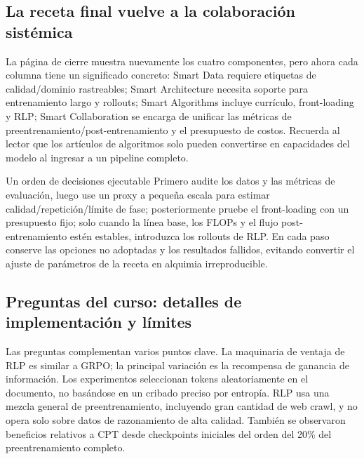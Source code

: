 \subsection{La receta final vuelve a la colaboración sistémica}

La página de cierre muestra nuevamente los cuatro componentes, pero ahora cada columna tiene un significado concreto: Smart Data requiere etiquetas de calidad/dominio rastreables; Smart Architecture necesita soporte para entrenamiento largo y rollouts; Smart Algorithms incluye currículo, front-loading y RLP; Smart Collaboration se encarga de unificar las métricas de preentrenamiento/post-entrenamiento y el presupuesto de costos. Recuerda al lector que los artículos de algoritmos solo pueden convertirse en capacidades del modelo al ingresar a un pipeline completo.


\begin{knowledgebox}{Un orden de decisiones ejecutable}
Primero audite los datos y las métricas de evaluación, luego use un proxy a pequeña escala para estimar calidad/repetición/límite de fase; posteriormente pruebe el front-loading con un presupuesto fijo; solo cuando la línea base, los FLOPs y el flujo post-entrenamiento estén estables, introduzca los rollouts de RLP. En cada paso conserve las opciones no adoptadas y los resultados fallidos, evitando convertir el ajuste de parámetros de la receta en alquimia irreproducible.
\end{knowledgebox}

\subsection{Preguntas del curso: detalles de implementación y límites}

Las preguntas complementan varios puntos clave. La maquinaria de ventaja de RLP es similar a GRPO; la principal variación es la recompensa de ganancia de información. Los experimentos seleccionan tokens aleatoriamente en el documento, no basándose en un cribado preciso por entropía. RLP usa una mezcla general de preentrenamiento, incluyendo gran cantidad de web crawl, y no opera solo sobre datos de razonamiento de alta calidad. También se observaron beneficios relativos a CPT desde checkpoints iniciales del orden del 20\% del preentrenamiento completo.

